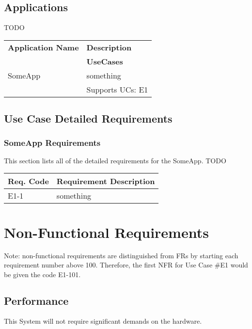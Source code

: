 \documentclass[12pt]{article}
\begin{document}
\subsection{Applications}

TODO

\begin{table}[!h]
	\begin{tabular}{| l | l |}
		\hline
		\textbf{Application Name} & \textbf{Description}\\ \cline{2-1}
															& \textbf{UseCases}\\
		\hline
		SomeApp	& something\\ \cline{2-1}
						& Supports UCs: E1\\
		\hline
	\end{tabular}
	\label{tab:Applications}
\end{table}

\subsection{Use Case Detailed Requirements}

\subsubsection{SomeApp Requirements}
This section lists all of the detailed requirements for the SomeApp.
TODO

\begin{table}[!h]
	\begin{tabular}{| l | l |}
	 	\hline
		\textbf{Req. Code} & \textbf{Requirement Description}\\
		\hline
		E1-1	& something\\
		\hline
	\end{tabular}
	\label{tab:SomeAppRequirements}
\end{table}


\section{Non-Functional Requirements}
Note: non-functional requirements are distinguished from FRs by starting each requirement number above 100. Therefore, the first 
NFR for Use Case \#E1 would be given the code E1-101.

\subsection{Performance}
This System will not require significant demands on the hardware.
\end{document}

